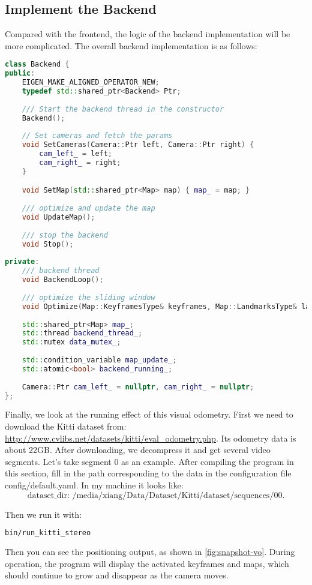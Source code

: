 \subsection{Implement the Backend}
Compared with the frontend, the logic of the backend implementation will be more complicated. The overall backend implementation is as follows:
\begin{lstlisting}[language=c++,caption=slambook2/ch13/include/myslam/backend.h]
class Backend {
public:
	EIGEN_MAKE_ALIGNED_OPERATOR_NEW;
	typedef std::shared_ptr<Backend> Ptr;
	
	/// Start the backend thread in the constructor 
	Backend();
	
	// Set cameras and fetch the params
	void SetCameras(Camera::Ptr left, Camera::Ptr right) {
		cam_left_ = left;
		cam_right_ = right;
	}

	void SetMap(std::shared_ptr<Map> map) { map_ = map; }
	
	/// optimize and update the map
	void UpdateMap();
	
	/// stop the backend
	void Stop();
	
private:
	/// backend thread
	void BackendLoop();
	
	/// optimize the sliding window
	void Optimize(Map::KeyframesType& keyframes, Map::LandmarksType& landmarks);
	
	std::shared_ptr<Map> map_;
	std::thread backend_thread_;
	std::mutex data_mutex_;
	
	std::condition_variable map_update_;
	std::atomic<bool> backend_running_;
	
	Camera::Ptr cam_left_ = nullptr, cam_right_ = nullptr;
};
\end{lstlisting}

Finally, we look at the running effect of this visual odometry. First we need to download the Kitti dataset from: \url{http://www.cvlibs.net/datasets/kitti/eval_odometry.php}. Its odometry data is about 22GB. After downloading, we decompress it and get several video segments. Let's take segment 0 as an example. After compiling the program in this section, fill in the path corresponding to the data in the configuration file config/default.yaml. In my machine it looks like:
$$\text{dataset_dir: /media/xiang/Data/Dataset/Kitti/dataset/sequences/00}.$$

Then we run it with:
\begin{lstlisting}[language=sh,caption=Terminal input:]
	bin/run_kitti_stereo
\end{lstlisting}
Then you can see the positioning output, as shown in \autoref{fig:snapshot-vo}. During operation, the program will display the activated keyframes and maps, which should continue to grow and disappear as the camera moves.

